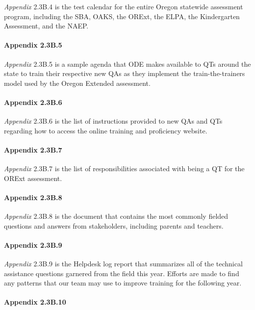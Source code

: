 \documentclass[]{article}
\let\oldparagraph\paragraph
\renewcommand{\paragraph}[1]{\oldparagraph{#1}\mbox{}}
\begin{document}
\emph{Appendix} 2.3B.4 is the test calendar for the entire Oregon
statewide assessment program, including the SBA, OAKS, the ORExt, the
ELPA, the Kindergarten Assessment, and the NAEP.

\paragraph{Appendix 2.3B.5}\label{appendix-2.3b.5}

\emph{Appendix} 2.3B.5 is a sample agenda that ODE makes available to
QTs around the state to train their respective new QAs as they implement
the train-the-trainers model used by the Oregon Extended assessment.

\paragraph{Appendix 2.3B.6}\label{appendix-2.3b.6}

\emph{Appendix} 2.3B.6 is the list of instructions provided to new QAs
and QTs regarding how to access the online training and proficiency
website.

\paragraph{Appendix 2.3B.7}\label{appendix-2.3b.7}

\emph{Appendix} 2.3B.7 is the list of responsibilities associated with
being a QT for the ORExt assessment.

\paragraph{Appendix 2.3B.8}\label{appendix-2.3b.8}

\emph{Appendix} 2.3B.8 is the document that contains the most commonly
fielded questions and answers from stakeholders, including parents and
teachers.

\paragraph{Appendix 2.3B.9}\label{appendix-2.3b.9}

\emph{Appendix} 2.3B.9 is the Helpdesk log report that summarizes all of
the technical assistance questions garnered from the field this year.
Efforts are made to find any patterns that our team may use to improve
training for the following year.

\paragraph{Appendix 2.3B.10}\label{appendix-2.3b.10}
\end{document}

